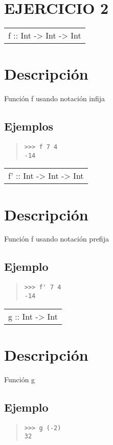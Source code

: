 \section{EJERCICIO 2}
\begin{haddockdesc}
\item[\begin{tabular}{@{}l}
f :: Int -> Int -> Int
\end{tabular}]
{\haddockbegindoc
\section*{Descripción}
Función f usando notación infija\par
\subsection*{Ejemplos}
\begin{quote}
{\haddockverb\begin{verbatim}
>>> f 7 4
-14

\end{verbatim}}
\end{quote}}
\end{haddockdesc}
\begin{haddockdesc}
\item[\begin{tabular}{@{}l}
f' :: Int -> Int -> Int
\end{tabular}]
{\haddockbegindoc
\section*{Descripción}
Función f usando notación prefija\par
\subsection*{Ejemplo}
\begin{quote}
{\haddockverb\begin{verbatim}
>>> f' 7 4
-14

\end{verbatim}}
\end{quote}}
\end{haddockdesc}
\begin{haddockdesc}
\item[\begin{tabular}{@{}l}
g :: Int -> Int
\end{tabular}]
{\haddockbegindoc
\section*{Descripción}
Función g\par
\subsection*{Ejemplo}
\begin{quote}
{\haddockverb\begin{verbatim}
>>> g (-2)
32

\end{verbatim}}
\end{quote}}
\end{haddockdesc}
